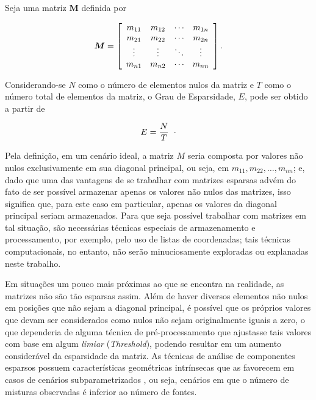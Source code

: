 \begin{definition}
    Seja uma matriz $\bm{M}$ definida por

    \begin{equation}
        \bm{M} =
        \left[\begin{array}{cccc}
        m_{11} & m_{12} & \cdots & m_{1n} \\
        m_{21} & m_{22} & \cdots & m_{2n} \\
        \vdots & \vdots & \ddots & \vdots \\
        m_{n1} & m_{n2} & \cdots & m_{nn}
        \end{array}\right].
        \vspace{0.2cm}
    \end{equation}

    Considerando-se $N$ como o número de elementos nulos da matriz e $T$ como o número total de elementos da matriz, o Grau de Esparsidade, $E$, pode ser obtido a partir de

    \begin{equation}
        E = \dfrac{N}{T}
        \hspace{0.2cm}\cdot
        \label{eq:bss_sparsity}
    \end{equation}

    \label{def:sparsity}
\end{definition}

Pela definição, em um cenário ideal, a matriz $M$ seria composta por valores não nulos exclusivamente em sua diagonal principal, ou seja, em $m_{11}, m_{22}, \dots , m_{nn}$; e, dado que uma das vantagens de se trabalhar com matrizes esparsas advém do fato de ser possível armazenar apenas os valores não nulos das matrizes, isso significa que, para este caso em particular, apenas os valores da diagonal principal seriam armazenados. Para que seja possível trabalhar com matrizes em tal situação, são necessárias técnicas especiais de armazenamento e processamento, por exemplo, pelo uso de listas de coordenadas; tais técnicas computacionais, no entanto, não serão minuciosamente exploradas ou explanadas neste trabalho.

Em situações um pouco mais próximas ao que se encontra na realidade, as matrizes não são tão esparsas assim. Além de haver diversos elementos não nulos em posições que não sejam a diagonal principal, é possível que os próprios valores que devam ser considerados como nulos não sejam originalmente iguais a zero, o que dependeria de alguma técnica de pré-processamento que ajustasse tais valores com base em algum \textit{limiar} (\textit{Threshold}), podendo resultar em um aumento considerável da esparsidade da matriz. As técnicas de análise de componentes esparsos possuem características geométricas intrínsecas que as favorecem em casos de cenários subparametrizados \citep{theis2003linear}, ou seja, cenários em que o número de misturas observadas é inferior ao número de fontes.

